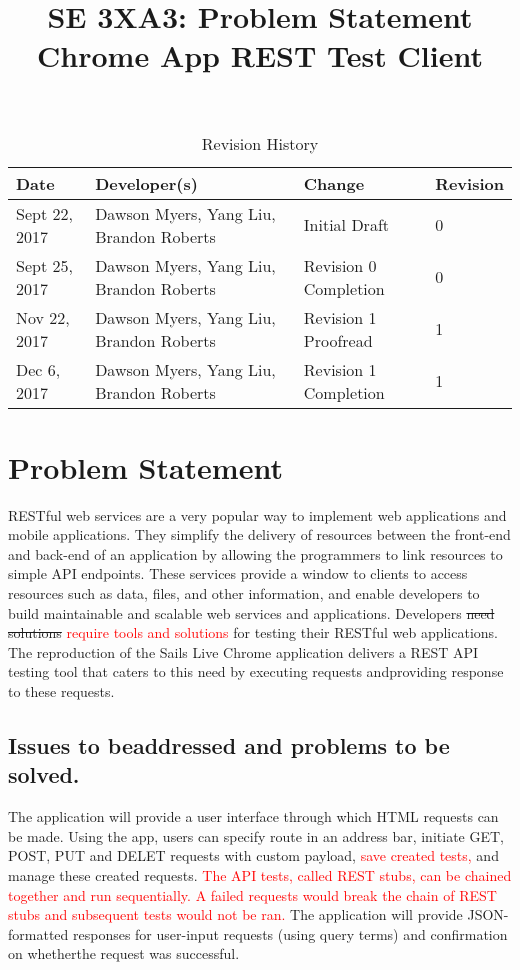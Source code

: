 \documentclass{article}
\title{SE 3XA3: Problem Statement\\Chrome App REST Test Client}
\begin{document}
\begin{table}[hp]
\caption{Revision History} \label{TblRevisionHistory}
\begin{tabularx}{\textwidth}{lXlX}
\toprule
\textbf{Date} & \textbf{Developer(s)} & \textbf{Change} & \textbf{Revision}\\
\midrule
Sept​ ​22,​ ​2017 & Dawson Myers, Yang Liu, Brandon Roberts & Initial Draft & 0\\
\hline
Sept​ ​25,​ ​2017 & Dawson Myers, Yang Liu, Brandon Roberts & Revision​ ​0​ ​Completion & 0\\
\hline
Nov​ ​22,​ ​2017 & Dawson Myers, Yang Liu, Brandon Roberts & Revision​ ​1 Proofread & 1\\
\hline
Dec 6,​ ​2017 & Dawson Myers, Yang Liu, Brandon Roberts & Revision​ ​1 Completion & 1\\
\hline
\bottomrule
\end{tabularx}
\end{table}

\newpage

\maketitle

\newpage
\section{Problem Statement}
RESTful web services are a very popular way to implement web applications and mobile applications. They simplify the delivery of resources between the front-end and back-end of an application by allowing the programmers to link resources to simple API endpoints. These services provide a window to clients to access resources such as data, files, and other information, and enable developers to build maintainable and scalable web services and applications. Developers \sout{need solutions} \textcolor{red}{require tools and solutions} for testing their RESTful web applications. The reproduction of the Sails Live Chrome application delivers a REST API testing tool that caters to this​ ​need​ ​by​ ​executing​ ​requests​ ​and​ ​providing​ ​response​ ​to​ ​these​ ​requests.

\subsection{Issues​ ​to​ ​be​ ​addressed​ ​and​ ​problems​ ​to​ ​be​ ​solved.}

The application will provide a user interface through which HTML requests can be made. Using the app, users can specify route in an address bar, initiate GET, POST, PUT and DELET requests with custom payload, \textcolor{red}{save created tests,} and manage these created requests. \textcolor{red}{The API tests, called REST stubs, can be chained together and run sequentially. A failed requests would break the chain of REST stubs and subsequent tests would not be ran.} The application will provide JSON-formatted responses for user-input requests (using query terms) and confirmation on whether​ ​the​ ​request​ ​was​ ​successful. 
\end{document}
